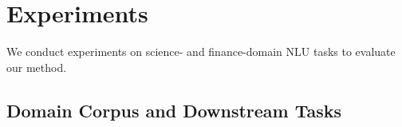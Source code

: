 \documentclass[11pt]{article}
\begin{document}
\section{Experiments}
We conduct experiments on science- and finance-domain NLU tasks to evaluate our method.

\subsection{Domain Corpus and Downstream Tasks}



\begin{table}[t]
    \centering
    \caption{Average results on all downstream tasks against different corpus sizes of pre-training.
    $|\mathcal{D}|$ is the corpus size for corresponding domain.}
    \label{tab:pretrain_corpus}
\end{table}




\begin{table}[t]
    \centering
    \caption{Average results of VarMAE on all downstream tasks against different masking ratios of pre-training.
    }
    \label{tab:mask}
\end{table}
\end{document}
